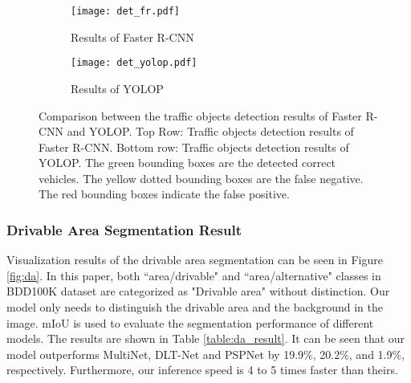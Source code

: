\documentclass[10pt,twocolumn,letterpaper]{article}
\begin{document}
\begin{figure*}
\centering
\begin{subfigure}{\linewidth}
  \texttt{[image: det\_fr.pdf]}
  \caption{Results of Faster R-CNN}
\end{subfigure}

\begin{subfigure}{\linewidth}
  \texttt{[image: det\_yolop.pdf]}
  \caption{Results of YOLOP}
\end{subfigure}
\caption{Comparison between the traffic objects detection results of Faster R-CNN and YOLOP. Top Row: Traffic objects detection results of Faster R-CNN. Bottom row: Traffic objects detection results of YOLOP. The green bounding boxes are the detected correct vehicles. The yellow dotted bounding boxes are the false negative. The red  bounding boxes indicate the false positive.}
\label{fig:detect_vs}
\end{figure*}


\begin{table}
\begin{center}
\end{center}
\caption{Traffic Object Detection Results: comparing the proposed YOLOP with state-of-the-art detectors.}
\label{table:det_result}
\end{table}

\subsubsection{Drivable Area Segmentation Result}
Visualization results of the drivable area segmentation can be seen in Figure \ref{fig:da}. In this paper, both ``area/drivable" and ``area/alternative" classes in BDD100K dataset are categorized as "Drivable area" without distinction. Our model only needs to distinguish the drivable area and the background in the image. mIoU is used to evaluate the segmentation performance of different models. The results are shown in Table \ref{table:da_result}. It can be seen that our model outperforms MultiNet, DLT-Net and PSPNet by 19.9\%, 20.2\%, and 1.9\%, respectively. Furthermore, our inference speed is 4 to 5 times faster than theirs.
\end{document}
